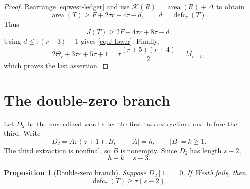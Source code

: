 \documentclass[11pt]{article}
\newtheorem{proposition}[theorem]{Proposition}
\theoremstyle{definition}
\theoremstyle{remark}
\newcommand{\area}{\operatorname{area}}
\newcommand{\defc}{\operatorname{defc}}
\newcommand{\kap}{\mathcal K}
\begin{document}
\begin{proof}
Rearrange \eqref{eq:west-ledger} and use
$\kap(R)=\area(R)+\Delta$ to obtain
\[
 \area(T)\ge F+2\tau r+4\tau-d,
 \qquad d=\defc_\tau(T).
\]
Thus
\[
 J(T)\ge2F+4\tau r+8\tau-d.
\]
Using $d\le\tau(r+3)-1$ gives \eqref{eq:J-lower}.
Finally,
\[
 2\Theta_r+3\tau r+5\tau+1
 =\tau\frac{(r+5)(r+4)}2=M_{r+5},
\]
which proves the last assertion.
\end{proof}

\section{The double-zero branch}

Let $D_2$ be the normalized word after the first two extractions and
before the third.  Write
\begin{equation}
 D_2=A:(z+1):B,
 \qquad |A|=h,
 \qquad |B|=k\ge1.
 \label{eq:D2-decomposition}
\end{equation}
The third extraction is nonfinal, so $B$ is nonempty.  Since
$D_2$ has length $s-2$,
\begin{equation}
 h+k=s-3.
 \label{eq:h-k}
\end{equation}

\begin{proposition}[Double-zero branch]
\label{prop:double-zero}
Suppose $D_2[1]=0$.  If West5 fails, then
\begin{equation}
 \defc_\tau(T)\ge\tau(s-2).
 \label{eq:double-zero-contradiction}
\end{equation}
\end{proposition}
\end{document}
